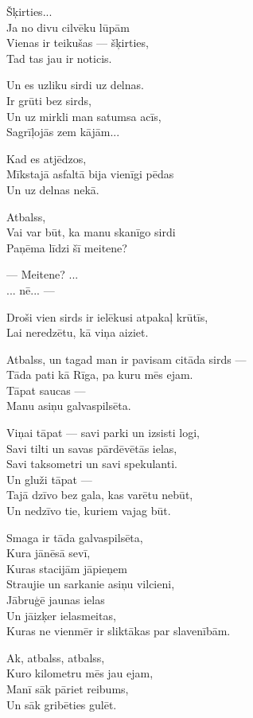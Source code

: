 \documentclass[14pt]{extarticle}
\begin{document}
Šķirties...\\
Ja no divu cilvēku lūpām\\
Vienas ir teikušas --- šķirties,\\
Tad tas jau ir noticis.

Un es uzliku sirdi uz delnas.\\
Ir grūti bez sirds,\\
Un uz mirkli man satumsa acīs,\\
Sagrīļojās zem kājām...

Kad es atjēdzos,\\
Mīkstajā asfaltā bija vienīgi pēdas\\
Un uz delnas nekā.

Atbalss,\\
Vai var būt, ka manu skanīgo sirdi\\
Paņēma līdzi šī meitene?

--- Meitene? ...\\
... nē... ---

Droši vien sirds ir ielēkusi atpakaļ krūtīs,\\
Lai neredzētu, kā viņa aiziet.

Atbalss, un tagad man ir pavisam citāda sirds ---\\
Tāda pati kā Rīga, pa kuru mēs ejam.\\
Tāpat saucas ---\\
Manu asiņu galvaspilsēta.

Viņai tāpat --- savi parki un izsisti logi,\\
Savi tilti un savas pārdēvētās ielas,\\
Savi taksometri un savi spekulanti.\\
Un gluži tāpat ---\\
Tajā dzīvo bez gala, kas varētu nebūt,\\
Un nedzīvo tie, kuriem vajag būt.

Smaga ir tāda galvaspilsēta,\\
Kura jānēsā sevī,\\
Kuras stacijām jāpieņem\\
Straujie un sarkanie asiņu vilcieni,\\
Jābruģē jaunas ielas\\
Un jāizķer ielasmeitas,\\
Kuras ne vienmēr ir sliktākas par slavenībām.

Ak, atbalss, atbalss,\\
Kuro kilometru mēs jau ejam,\\
Manī sāk pāriet reibums,\\
Un sāk gribēties gulēt.
\end{document}
